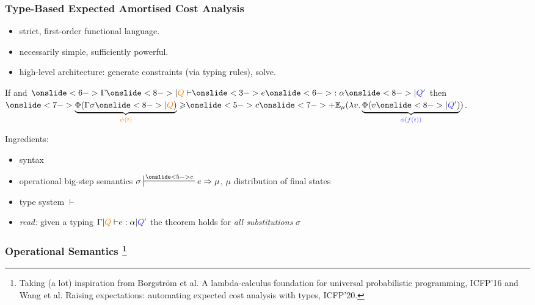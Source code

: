 \documentclass[
11pt,
usepdftitle=false,
aspectratio=169,
xcolor={table,usenames,dvipsnames},
handout,
]{beamer}
\newcommand{\red}[1]{{\color{orange} #1}} %
\newcommand{\blue}[1]{{\color{blue!80} #1}}
\begin{document}
\begin{frame}
  \frametitle{Type-Based Expected Amortised Cost Analysis}
\begin{itemize}
\item \alert<3>{strict, first-order functional language.}
\item \alert<3>{necessarily simple, sufficiently powerful.}
\item{high-level architecture: generate constraints (via typing rules), solve.}
\end{itemize}

\begin{theorem}[Soundness]
\centering
\smallskip  
If
and
$\onslide<6->{\Gamma \onslide<8->{{\mid} \red{Q}} \vdash} \onslide<3->{e} \onslide<6->{: \alpha} \onslide<8->{{\mid} \blue{Q'}}$
then
$\onslide<7->{\underbrace{\Phi(\Gamma\sigma\onslide<8->{{\mid} \red{Q}})}_{\red{\psi(t)}} \geqslant} \onslide<5->{c}
  \onslide<7->{+ \Expect{\mu}{\lambda v. \underbrace{\Phi(v \onslide<8->{{\mid} \blue{Q'}})}_{\blue{\phi(f(t))}}}}$.
\end{theorem}
 
Ingredients:
\begin{itemize}
\item<3-> \alert<3>{syntax}
\item<4-> operational big-step semantics \alert<4>{$\eval{\sigma}{\onslide<5->{c}}{e}{\mu}$, $\mu$ distribution of final states} 
\item<6-> type system $\vdash$ 
\item<9-> \emph{read:} given a typing ${\Gamma {{\mid} \red{Q}} \vdash} {e: \alpha}{{\mid} \blue{Q'}}$ the theorem holds for
  \emph{all substitutions} $\sigma$    
\end{itemize}
\end{frame}

\begin{frame}
  \frametitle{Operational Semantics%
    \footnote{%
    Taking (a lot) inspiration from Borgström et al. A lambda-calculus foundation for universal probabilistic programming, ICFP'16 and Wang et al. Raising expectations: automating expected cost analysis with types, ICFP'20.}}
  

\end{frame}
\end{document}
